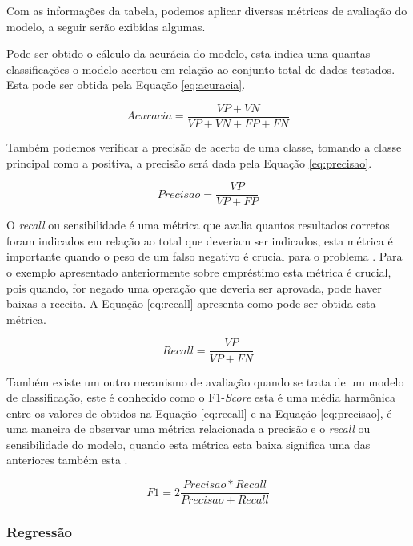 \documentclass[
12pt,				%
oneside,			%
a4paper,			%
english,			%
french,				%
spanish,			%
brazil				%
]{abntex2}
\begin{document}
Com as informações da tabela, podemos aplicar diversas métricas de avaliação do modelo, a seguir serão exibidas algumas.

Pode ser obtido o cálculo da acurácia do modelo, esta indica uma quantas classificações o modelo acertou em relação ao conjunto total de dados testados. Esta pode ser obtida pela Equação \ref{eq:acuracia}.
  
 \begin{equation}
 Acuracia = \frac{VP + VN}{VP+VN+FP+FN}
 \label{eq:acuracia}
 \end{equation}

Também podemos verificar a precisão de acerto de uma classe, tomando a classe principal como a positiva, a precisão será dada pela Equação \ref{eq:precisao}.

 \begin{equation}
Precisao = \frac{VP}{VP+FP}
\label{eq:precisao}
\end{equation}

O \textit{recall} ou sensibilidade é uma métrica que avalia quantos resultados corretos foram indicados em relação ao total que deveriam ser indicados, esta métrica é importante quando o peso de um falso negativo é crucial para o problema \cite{pedregosa2011scikit}. Para o exemplo apresentado anteriormente sobre empréstimo esta métrica é crucial, pois quando, for negado uma operação que deveria ser aprovada, pode haver baixas a receita. A Equação \ref{eq:recall} apresenta como pode ser obtida esta métrica.

 \begin{equation}
Recall = \frac{VP}{VP+FN}
\label{eq:recall}
\end{equation}

 Também existe um outro mecanismo de avaliação quando se trata de um modelo de classificação, este é conhecido como o F1-\textit{Score} esta é uma média harmônica entre os valores de obtidos na Equação \ref{eq:recall} e na Equação \ref{eq:precisao}, é uma maneira de observar uma métrica relacionada a precisão e o \textit{recall} ou sensibilidade do modelo, quando esta métrica esta baixa significa uma das anteriores também esta \cite{sammut2011encyclopedia}.

 \begin{equation}
F1 = 2\frac{Precisao*Recall}{Precisao+Recall}
\label{eq:f1}
\end{equation}

\subsubsection{Regressão}
\end{document}

